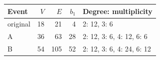 \begin{tabular}{@{}lrrrl@{}}\toprule Event & $V$ & $E$ & $b_1$ & Degree: multiplicity\\\midrule
original & 18 & 21 & 4 & 2: 12, 3: 6 \\
A & 36 & 63 & 28 & 2: 12, 3: 6, 4: 12, 6: 6 \\
B & 54 & 105 & 52 & 2: 12, 3: 6, 4: 24, 6: 12 \\
\bottomrule\end{tabular}